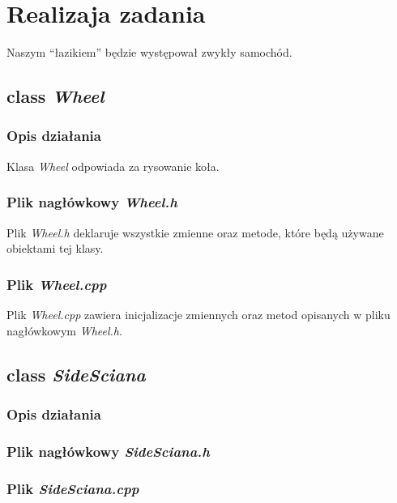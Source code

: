 \documentclass[a4paper, 12pt]{report}
\begin{document}
\section{Realizaja zadania}

Naszym ``łazikiem'' będzie występował zwykły samochód.

\subsection{class \emph{Wheel}}
\subsubsection{Opis działania}

Klasa \emph{Wheel} odpowiada za rysowanie koła.


\subsubsection{Plik nagłówkowy \emph{Wheel.h}}

Plik \emph{Wheel.h} deklaruje wszystkie zmienne oraz metode, które będą używane obiektami tej klasy.



\subsubsection{Plik \emph{Wheel.cpp}}

Plik \emph{Wheel.cpp} zawiera inicjalizacje zmiennych oraz metod opisanych w pliku nagłówkowym \emph{Wheel.h}.



\subsection{class \emph{SideSciana}}
\subsubsection{Opis działania}
\subsubsection{Plik nagłówkowy \emph{SideSciana.h}}

\subsubsection{Plik \emph{SideSciana.cpp}}

\end{document}
